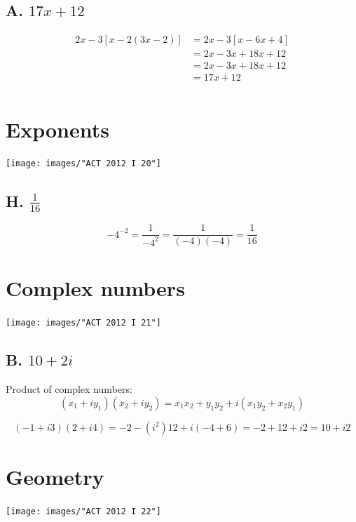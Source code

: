 \documentclass[11pt, oneside]{article}
\begin{document}
\subsection{A. $17x +12$}
%
\begin{equation}
	\begin{split}
		2x-3\left[x-2(3x-2) \right] 
			&= 2x-3\left[ x-6x+4 \right] \\
			&= 2x-3x +18x +12  \\
			&= 2x-3x +18x +12  \\
			&= 17x +12  \\
	\end{split}
\end{equation}
%

\section{Exponents}
\texttt{[image: images/"ACT 2012 I 20"]}
\subsection{H. $\frac{1}{16}$}
%
\begin{equation}
	-4^{-2} = \frac{1}{-4^{2}} = \frac{1}{(-4)(-4)} = \frac{1}{16}
\end{equation}
%


\section{Complex numbers}
\texttt{[image: images/"ACT 2012 I 21"]}
\subsection{B. $10+2i$}

Product of complex numbers:
$$(x_{1} + i y_{1}) (x_{2} + i y_{2}) = x_{1}x_{2} + y_{1}y_{2} + i (x_{1}y_{2} + x_{2}y_{1})$$

%
\begin{equation}
	(-1+i3)(2+i4) = -2 - (i^{2}) 12 + i (-4+6) = -2 +12 + i 2 = 10 + i2
\end{equation}
%

\section{Geometry}
\texttt{[image: images/"ACT 2012 I 22"]}
\end{document}
